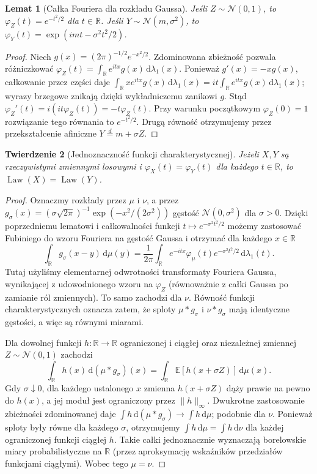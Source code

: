 \documentclass[11pt,a4paper,oneside]{report}
\numberwithin{equation}{chapter}
\theoremstyle{plain}
\newtheorem{twierdzenie}{Twierdzenie}[chapter]
\newtheorem{lemat}[twierdzenie]{Lemat}
\theoremstyle{definition}
\theoremstyle{remark}
\newcommand{\R}{\mathbb{R}}
\newcommand{\E}{\mathbb{E}}
\newcommand{\Law}{\operatorname{Law}}
\newcommand{\dd}{\mathrm{d}}
\newcommand{\Normal}{\mathcal{N}}
\begin{document}
\begin{lemat}[Całka Fouriera dla rozkładu Gaussa]
Jeśli $Z\sim\Normal(0,1)$, to
$\varphi_Z(t)=e^{-t^2/2}$ dla $t\in\R$.
Jeśli $Y\sim\Normal(m,\sigma^2)$, to
$\varphi_Y(t)=\exp(imt-\sigma^2t^2/2)$.
\end{lemat}
\begin{proof}
Niech $g(x)=(2\pi)^{-1/2}e^{-x^2/2}$.
Zdominowana zbieżność pozwala różniczkować
$\varphi_Z(t)=\int_\R e^{itx}g(x)\,\dd\lambda_1(x)$.
Ponieważ $g'(x)=-xg(x)$, całkowanie przez części daje
$\int_\R xe^{itx}g(x)\,\dd\lambda_1(x)
=it\int_\R e^{itx}g(x)\,\dd\lambda_1(x)$;
wyrazy brzegowe znikają dzięki wykładniczemu zanikowi $g$.
Stąd $\varphi_Z'(t)=i(it\varphi_Z(t))=-t\varphi_Z(t)$.
Przy warunku początkowym $\varphi_Z(0)=1$ rozwiązanie tego
równania to $e^{-t^2/2}$. Drugą równość otrzymujemy
przez przekształcenie afiniczne $Y\stackrel d=m+\sigma Z$.
\end{proof}

\begin{twierdzenie}[Jednoznaczność funkcji charakterystycznej]
Jeżeli $X,Y$ są rzeczywistymi zmiennymi losowymi i
$\varphi_X(t)=\varphi_Y(t)$ dla każdego $t\in\R$,
to $\Law(X)=\Law(Y)$.
\end{twierdzenie}
\begin{proof}
Oznaczmy rozkłady przez $\mu$ i $\nu$, a przez
$g_\sigma(x)=(\sigma\sqrt{2\pi})^{-1}
\exp(-x^2/(2\sigma^2))$ gęstość $\Normal(0,\sigma^2)$
dla $\sigma>0$. Dzięki poprzedniemu lematowi i
całkowalności funkcji $t\mapsto e^{-\sigma^2t^2/2}$
możemy zastosować Fubiniego do wzoru Fouriera na gęstość
Gaussa i otrzymać dla każdego $x\in\R$
\[
\int_\R g_\sigma(x-y)\,\dd\mu(y)
=\frac1{2\pi}\int_\R
 e^{-itx}\varphi_\mu(t)e^{-\sigma^2t^2/2}
\,\dd\lambda_1(t).
\]
Tutaj użyliśmy elementarnej odwrotności transformaty
Fouriera Gaussa, wynikającej z udowodnionego wzoru na
$\varphi_Z$ (równoważnie z całki Gaussa po zamianie
ról zmiennych). To samo zachodzi dla $\nu$.
Równość funkcji charakterystycznych oznacza zatem,
że sploty $\mu*g_\sigma$ i $\nu*g_\sigma$ mają
identyczne gęstości, a więc są równymi miarami.

Dla dowolnej funkcji $h:\R\to\R$ ograniczonej i ciągłej
oraz niezależnej zmiennej $Z\sim\Normal(0,1)$ zachodzi
\[
\int_\R h(x)\,\dd(\mu*g_\sigma)(x)
=\int_\R\E[h(x+\sigma Z)]\,\dd\mu(x).
\]
Gdy $\sigma\downarrow0$, dla każdego ustalonego $x$
zmienna $h(x+\sigma Z)$ dąży prawie na pewno do $h(x)$,
a jej moduł jest ograniczony przez $\|h\|_\infty$.
Dwukrotne zastosowanie zbieżności zdominowanej daje
$\int h\,\dd(\mu*g_\sigma)\to\int h\,\dd\mu$;
podobnie dla $\nu$. Ponieważ sploty były równe dla
każdego $\sigma$, otrzymujemy
$\int h\,\dd\mu=\int h\,\dd\nu$ dla każdej
ograniczonej funkcji ciągłej $h$. Takie całki
jednoznacznie wyznaczają borelowskie miary probabilistyczne
na $\R$ (przez aproksymację wskaźników przedziałów
funkcjami ciągłymi). Wobec tego $\mu=\nu$.
\end{proof}
\end{document}

